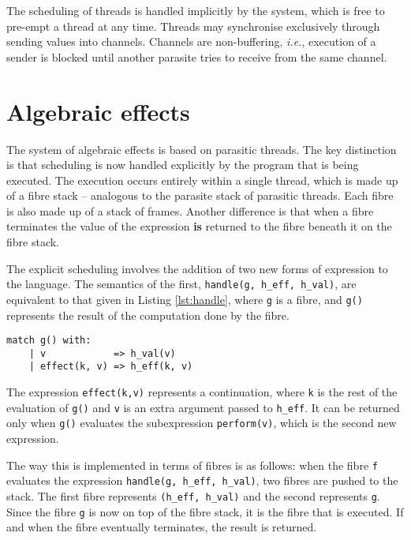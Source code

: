 \documentclass[12pt,a4paper,twoside,openright]{report}
\begin{document}
The scheduling of threads is handled implicitly by the system, which is free to pre-empt a thread at any time.  Threads may synchronise exclusively through sending values into channels. Channels are non-buffering, \textit{i.e.}, execution of a sender is blocked until another parasite tries to receive from the same channel.

\section{Algebraic effects}\label{prepalg}

The system of algebraic effects is based on parasitic threads. The key distinction is that scheduling is now handled explicitly by the program that is being executed. The execution occurs entirely within a single thread, which is made up of a fibre stack -- analogous to the parasite stack of parasitic threads. Each fibre is also made up of a stack of frames. Another difference is that when a fibre terminates the value of the expression \textbf{is} returned to the fibre beneath it on the fibre stack.

The explicit scheduling involves the addition of two new forms of expression to the language. The semantics of the first, \texttt{handle(g, h\_eff, h\_val)}, are equivalent to that given in Listing \ref{lst:handle}, where \texttt{g} is a fibre, and \texttt{g()} represents the result of the computation done by the fibre.


\begin{minipage}{\linewidth} \begin{lstlisting}[caption=The semantics of \texttt{handle},label={lst:handle}]
  match g() with:
    | v            => h_val(v)
    | effect(k, v) => h_eff(k, v)
\end{lstlisting} \end{minipage}

The expression \texttt{effect(k,v)} represents a continuation, where \texttt{k} is the rest of the evaluation of \texttt{g()} and \texttt{v} is an extra argument passed to \texttt{h\_eff}. It can be returned only when \texttt{g()} evaluates the subexpression \texttt{perform(v)}, which is the second new expression.

The way this is implemented in terms of fibres is as follows: when the fibre \texttt{f} evaluates the expression \texttt{handle(g, h\_eff, h\_val)}, two fibres are pushed to the stack. The first fibre represents \texttt{(h\_eff, h\_val)} and the second represents \texttt{g}. Since the fibre \texttt{g} is now on top of the fibre stack, it is the fibre that is executed. If and when the fibre eventually terminates, the result is returned.
\end{document}
